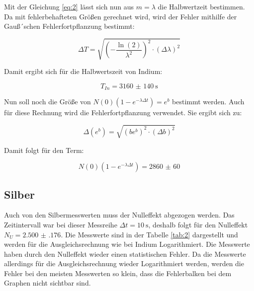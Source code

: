 Mit der Gleichung \ref{eq:2} lässt sich nun aus $m = \lambda$ die Halbwertzeit bestimmen.
Da mit fehlerbehafteten Größen gerechnet wird, wird der Fehler mithilfe der Gauß´schen
Fehlerfortpflanzung bestimmt:

\begin{equation*}
  \Delta T = \sqrt{\left(-\frac{\ln(2)}{\lambda^2}\right)^2 \cdot (\Delta \lambda)^2}
\end{equation*}

Damit ergibt sich für die Halbwertszeit von Indium:

\begin{equation*}
  T_{In} = \SI{3160(140)}{\second}
\end{equation*}

Nun soll noch die Größe von $N(0)(1-e^{-\lambda \Delta t}) = e^b$ bestimmt werden.
Auch für diese Rechnung wird die Fehlerfortpflanzung verwendet. Sie ergibt sich zu:

\begin{equation*}
  \Delta (e^b) = \sqrt{\left( b e^b\right)^2 \cdot (\Delta b)^2}
\end{equation*}

Damit folgt für den Term:

\begin{equation*}
  N(0)(1-e^{-\lambda \Delta t}) = \num{2860(60)}
\end{equation*}


\subsection{Silber}
Auch von den Silbermesswerten muss der Nulleffekt abgezogen werden. Das Zeitintervall
war bei dieser Messreihe $\Delta t = \SI{10}{\second}$, deshalb folgt für den Nulleffekt
$N_U = \num{2.500(176)}$.
Die Messwerte sind in der Tabelle \ref{tab:2} dargestellt und werden für die Ausgleichsrechnung
wie bei Indium Logarithmiert.
Die Messwerte haben durch den Nulleffekt wieder einen
statistischen Fehler. Da die Messwerte allerdings für die Ausgleichsrechnung wieder
Logarithmiert werden, werden die Fehler bei den meisten Messwerten so klein,
dass die Fehlerbalken bei dem Graphen nicht sichtbar sind.

